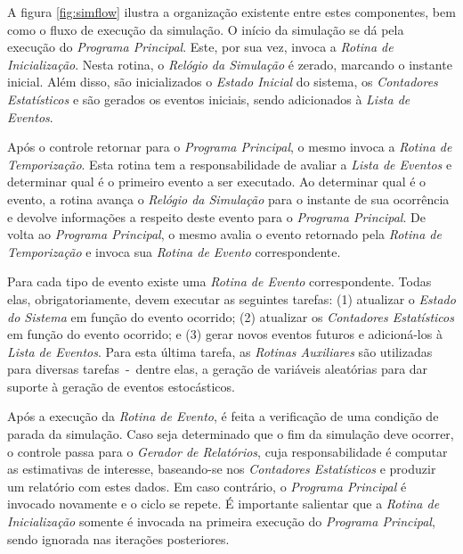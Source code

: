 A figura \ref{fig:simflow} ilustra a organização existente entre estes
componentes, bem como o fluxo de execução da simulação. O início da simulação se
dá pela execução do \textit{Programa Principal}. Este, por sua vez, invoca a
\textit{Rotina de Inicialização}. Nesta rotina, o \textit{Relógio da Simulação}
é zerado, marcando o instante inicial. Além disso, são inicializados o
\textit{Estado Inicial} do sistema, os \textit{Contadores Estatísticos} e são
gerados os eventos iniciais, sendo adicionados à \textit{Lista de Eventos}.

Após o controle retornar para o \textit{Programa Principal}, o mesmo invoca a
\textit{Rotina de Temporização}. Esta rotina tem a responsabilidade de avaliar a
\textit{Lista de Eventos} e determinar qual é o primeiro evento a ser executado.
Ao determinar qual é o evento, a rotina avança o \textit{Relógio da Simulação}
para o instante de sua ocorrência e devolve informações a respeito deste evento
para o \textit{Programa Principal}. De volta ao \textit{Programa Principal}, o
mesmo avalia o evento retornado pela \textit{Rotina de Temporização} e invoca
sua \textit{Rotina de Evento} correspondente.

Para cada tipo de evento existe uma \textit{Rotina de Evento} correspondente.
Todas elas, obrigatoriamente, devem executar as seguintes tarefas: (1) atualizar
o \textit{Estado do Sistema} em função do evento ocorrido; (2) atualizar os
\textit{Contadores Estatísticos} em função do evento ocorrido; e (3) gerar
novos eventos futuros e adicioná-los à \textit{Lista de Eventos}. Para esta
última tarefa, as \textit{Rotinas Auxiliares} são utilizadas para diversas
tarefas~-~dentre elas, a geração de variáveis aleatórias para dar suporte à
geração de eventos estocásticos.

Após a execução da \textit{Rotina de Evento}, é feita a verificação de uma
condição de parada da simulação. Caso seja determinado que o fim da simulação
deve ocorrer, o controle passa para o \textit{Gerador de Relatórios}, cuja
responsabilidade é computar as estimativas de interesse, baseando-se nos
\textit{Contadores Estatísticos} e produzir um relatório com estes dados. Em
caso contrário, o \textit{Programa Principal} é invocado novamente e o ciclo se
repete. É importante salientar que a \textit{Rotina de Inicialização} somente é
invocada na primeira execução do \textit{Programa Principal}, sendo ignorada nas
iterações posteriores.